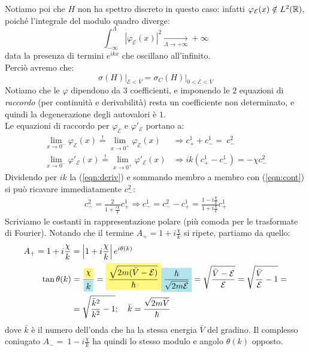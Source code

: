 \documentclass[../../FisicaTeorica.tex]{subfiles}
\begin{document}
Notiamo poi che $H$ non ha spettro discreto in questo caso: infatti $\varphi_\mathcal{E}(x)\notin L^2(\mathbb{R})$, poiché l'integrale del modulo quadro diverge:
\[
\int_{-\infty}^\Lambda |\varphi_\mathcal{E}(x)|^2 \xrightarrow[\Lambda \to +\infty]{}+\infty
\]
data la presenza di termini $e^{ikx}$ che oscillano all'infinito.\\
Perciò avremo che:
\[
\sigma(H)\Big|_{\mathcal{E}<\bar{V}}=\sigma_C(H)\Big|_{0<\mathcal{E}<\bar{V}}
\]
Notiamo che le $\varphi$ dipendono da $3$ coefficienti, e imponendo le $2$ equazioni di \textit{raccordo} (per continuità e derivabilità) resta un coefficiente non determinato, e quindi la degenerazione degli autovalori è $1$.\\
Le equazioni di raccordo per $\varphi_{\mathcal{E}}$ e $\varphi'_{\mathcal{E}}$ portano a:
\begin{align}
\lim_{x\to 0^-}\varphi_\mathcal{E}(x) \overset{!}{=}\lim_{x\to 0^+}\varphi_\mathcal{E}(x) &\Rightarrow c^1_+ + c^1_- =\ c^2_- \label{eqn:cont}
\\
\lim_{x\to 0^-}\varphi'_\mathcal{E}(x) \overset{!}{=}\lim_{x\to 0^+}\varphi'_\mathcal{E}(x) &\Rightarrow 
ik(c^1_+ - c^1_-) = -\chi c^2_- \label{eqn:deriv}
\end{align}
Dividendo per $ik$ la (\ref{eqn:deriv}) e sommando membro a membro con (\ref{eqn:cont}) si può ricavare immediatamente $c^2_-$:
\begin{align*}
c_-^2 = \frac{2}{1+\frac{i\chi}{k}}c_+^1\Rightarrow c^1_- = c^2_--c^1_+ = \frac{1-i\frac{\chi}{k}}{1+i\frac{\chi}{k}}c_+^1
\end{align*}
Scriviamo le costanti in rappresentazione polare (più comoda per le trasformate di Fourier). Notando che il termine $A_+=1+i\frac{\chi}{k}$ si ripete, partiamo da quello:
\begin{align*}
A_+=1+i\frac{\chi}{k}&=\left|1+i\frac{\chi}{k}\right|e^{i\theta(k)}\\
\tan\theta(k)&=\frac{\hlc{Yellow}{\chi}}{\hlc{SkyBlue}{k}}
=
\hlc{Yellow}{\frac{\sqrt{2m(\bar{V}-\mathcal{E})}}{\hbar}} \hlc{SkyBlue}{\frac{\hbar}{\sqrt{2m\mathcal{E}}}
}=\sqrt{\frac{\bar{V}-\mathcal{E}}{\mathcal{E}}} =\sqrt{\frac{\bar{V}}{\mathcal{E}}-1}=\\
&= \sqrt{\frac{\bar{k}^2}{k^2}-1}; \quad \bar{k}=\frac{\sqrt{2m\bar{V}}}{\hbar}
\end{align*}
dove $\bar{k}$ è il numero dell'onda che ha la stessa energia $\bar{V}$ del gradino. Il complesso coniugato $A_- =\ 1-i\frac{\chi}{k}$ ha quindi lo stesso modulo e angolo $\theta(k)$ opposto.\\
\end{document}
